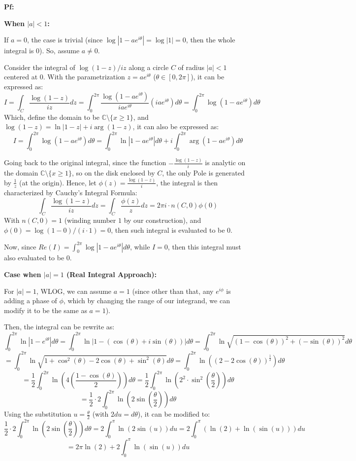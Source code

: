 \documentclass{article}
\begin{document}
\textbf{Pf:}

\textbf{When $|a|<1$:}

If $a=0$, the case is trivial (since $\log|1-ae^{i\theta}| = \log|1|=0$, then the whole integral is $0$). So, assume $a\neq 0$.

\hfil

Consider the integral of $\log(1-z)/iz$ along a circle $C$ of radius $|a|<1$ centered at $0$. With the parametrization $z=ae^{i\theta}$ ($\theta\in [0,2\pi]$), it can be expressed as:
$$I=\int_{C}\frac{\log(1-z)}{iz}dz = \int_{0}^{2\pi}\frac{\log(1-ae^{i\theta})}{iae^{i\theta}}(iae^{i\theta})d\theta = \int_{0}^{2\pi}\log(1-ae^{i\theta})d\theta$$
Which, define the domain to be $\mathbb{C}\setminus\{x\geq 1\}$, and $\log(1-z)=\ln|1-z|+i\arg(1-z)$, it can also be expressed as:
$$I= \int_{0}^{2\pi}\log(1-ae^{i\theta})d\theta=\int_{0}^{2\pi}\ln|1-ae^{i\theta}|d\theta + i\int_{0}^{2\pi}\arg(1-ae^{i\theta})d\theta$$

Going back to the original integral, since the function $-\frac{\log(1-z)}{i}$ is analytic on the domain $\mathbb{C}\setminus\{x\geq 1\}$, so on the disk enclosed by $C$, the only Pole 
is generated by $\frac{1}{z}$ (at the origin). Hence, let $\phi(z)=\frac{\log(1-z)}{i}$, the integral is then characterized by Cauchy's Integral Formula:
$$\int_{C}\frac{\log(1-z)}{iz}dz = \int_{C}\frac{\phi(z)}{z}dz = 2\pi i\cdot n(C,0)\phi(0)$$
With $n(C,0)=1$ (winding number $1$ by our construction), and $\phi(0)=\log(1-0)/(i\cdot 1)=0$, then such integral is evaluated to be $0$.

Now, since $Re(I) = \int_{0}^{2\pi}\log|1-ae^{i\theta}|d\theta$, while $I=0$, then this integral must also evaluated to be $0$.

\hfil

\textbf{Case when $|a|=1$ (Real Integral Approach):}

For $|a|=1$, WLOG, we can assume $a=1$ (since other than that, any $e^{i\phi}$ is adding a phase of $\phi$, which by changing the range of our integrand, we can modify it to be the same as $a=1$).

Then, the integral can be rewrite as:
$$\int_{0}^{2\pi}\ln|1-e^{i\theta}|d\theta = \int_{0}^{2\pi}\ln|1-(\cos(\theta)+i\sin(\theta))|d\theta = \int_{0}^{2\pi}\ln\sqrt{(1-\cos(\theta))^2+(-\sin(\theta))^2}d\theta$$
$$=\int_{0}^{2\pi}\ln\sqrt{1+\cos^2(\theta)-2\cos(\theta)+\sin^2(\theta)}d\theta = \int_{0}^{2\pi}\ln\left((2-2\cos(\theta))^\frac{1}{2}\right)d\theta$$
$$=\frac{1}{2}\int_{0}^{2\pi}\ln\left(4\left(\frac{1-\cos(\theta)}{2}\right)\right)d\theta = \frac{1}{2}\int_{0}^{2\pi}\ln\left(2^2\cdot \sin^2\left(\frac{\theta}{2}\right)\right)d\theta$$
$$ = \frac{1}{2}\cdot 2\int_{0}^{2\pi}\ln\left(2\sin\left(\frac{\theta}{2}\right)\right)d\theta$$
Using the substitution $u=\frac{\theta}{2}$ (with $2du = d\theta$), it can be modified to:
$$\frac{1}{2}\cdot 2\int_{0}^{2\pi}\ln\left(2\sin\left(\frac{\theta}{2}\right)\right)d\theta = 2\int_{0}^{\pi}\ln(2\sin(u))du = 2\int_{0}^{\pi}(\ln(2)+\ln(\sin(u)))du$$
$$ = 2\pi\ln(2) + 2\int_{0}^{\pi}\ln(\sin(u))du$$
\end{document}
